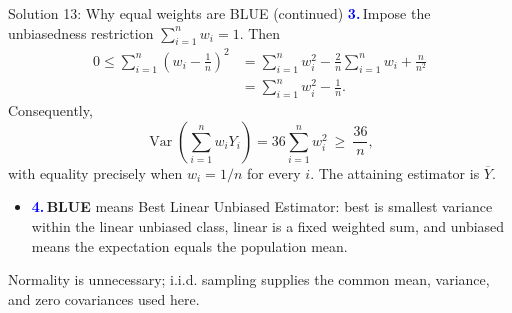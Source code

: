 \documentclass[notes,10pt, aspectratio=169]{beamer}
\newcommand{\Var}{\operatorname{Var}}
\newcommand{\answerpart}[1]{\textcolor{blue}{\textbf{#1.}}\,}
\begin{document}
\begin{frame}{Solution 13: Why equal weights are BLUE (continued)}
\small
\answerpart{3}Impose the unbiasedness restriction $\sum_{i=1}^n w_i=1$. Then
\[
\begin{aligned}
0\leq\sum_{i=1}^n\left(w_i-\frac1n\right)^2
&=\sum_{i=1}^n w_i^2-\frac2n\sum_{i=1}^n w_i+\frac{n}{n^2}\\
&=\sum_{i=1}^n w_i^2-\frac1n.
\end{aligned}
\]
Consequently,
\[
\Var\left(\sum_{i=1}^n w_iY_i\right)=36\sum_{i=1}^n w_i^2
\ \geq\ \frac{36}{n},
\]
with equality precisely when $w_i=1/n$ for every $i$. The attaining estimator is $\overline Y$.
\begin{itemize}
\setlength{\itemsep}{4pt}
\item \answerpart{4}\textbf{BLUE} means Best Linear Unbiased Estimator: best is smallest variance within the linear unbiased class, linear is a fixed weighted sum, and unbiased means the expectation equals the population mean.
\end{itemize}
Normality is unnecessary; i.i.d. sampling supplies the common mean, variance, and zero covariances used here.
\end{frame}
\fi
\end{document}
